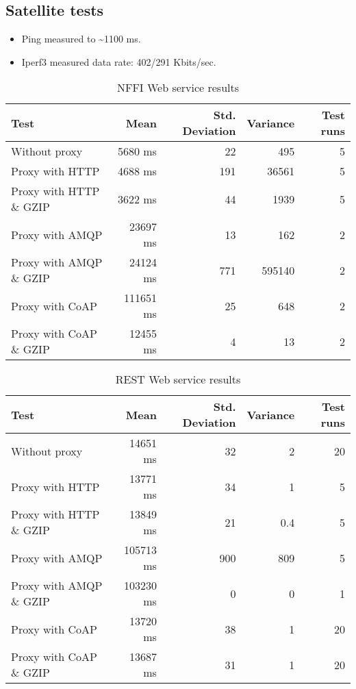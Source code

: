 \begin{appendices}
\section{Satellite tests}

\begin{itemize}
	\item Ping measured to \textasciitilde 1100 ms.
	\item Iperf3 measured data rate: 402/291 Kbits/sec.
\end{itemize}

\begin{table}[H]
\begin{tabular}{| l | r | r | r | r |}
\hline
  \textbf{Test} & \textbf{Mean} & \textbf{Std. Deviation} & \textbf{Variance} & \textbf{Test runs}\\ \hline
  Without proxy & 5680 ms & 22 & 495 & 5 \\ \hline
  Proxy with HTTP & 4688 ms & 191 & 36561 & 5 \\ \hline
  Proxy with HTTP \& GZIP & 3622 ms & 44 & 1939 & 5 \\ \hline
  Proxy with AMQP & 23697 ms & 13 & 162 & 2 \\ \hline
  Proxy with AMQP \& GZIP & 24124 ms & 771 & 595140 & 2\\ \hline
  Proxy with CoAP & 111651 ms & 25 & 648 & 2 \\ \hline
  Proxy with CoAP \& GZIP & 12455 ms & 4 & 13 & 2 \\ \hline
\end{tabular}
\caption{NFFI Web service results}
\end{table}


\begin{table}[H]
\begin{tabular}{| l | r | r | r | r |}
\hline
  \textbf{Test} & \textbf{Mean} & \textbf{Std. Deviation} & \textbf{Variance} & \textbf{Test runs}\\ \hline
  Without proxy & 14651 ms & 32 & 2 & 20 \\ \hline
  Proxy with HTTP & 13771 ms & 34 & 1 & 5 \\ \hline
  Proxy with HTTP \& GZIP & 13849 ms & 21 & 0.4 & 5 \\ \hline
  Proxy with AMQP & 105713 ms & 900 & 809 & 5 \\ \hline
  Proxy with AMQP \& GZIP & 103230 ms & 0 & 0 & 1\\ \hline
  Proxy with CoAP & 13720 ms & 38 & 1 & 20 \\ \hline
  Proxy with CoAP \& GZIP & 13687 ms & 31 & 1 & 20 \\ \hline
\end{tabular}
\caption{REST Web service results}
\end{table}




\end{appendices}
